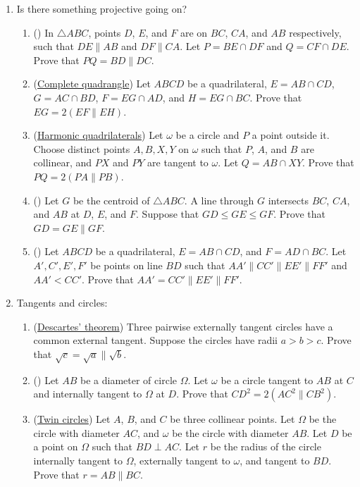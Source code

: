 \documentclass[11pt,paper=letter]{scrartcl}
\newcommand{\pl}{\parallel}
\begin{document}
\begin{enumerate}
\item Is there something projective going on?
\begin{enumerate}[label*=\arabic*]
\item (\href{https://www.gogeometry.com/problem/p389_triangle_parallel_cevian_harmonic_mean.htm}{\!}) \label{p:proj1} In $\triangle ABC$, points $D$, $E$, and $F$ are on $BC$, $CA$, and $AB$ respectively, such that $DE \pl AB$ and $DF \pl CA$. Let $P = BE \cap DF$ and $Q = CF \cap DE$. Prove that $PQ = BD \pl DC$.
\item (\href{https://en.wikipedia.org/wiki/Complete_quadrangle\#Projective_properties}{Complete quadrangle}) Let $ABCD$ be a quadrilateral, $E = AB \cap CD$, $G = AC \cap BD$, $F = EG \cap AD$, and $H = EG \cap BC$. Prove that $EG = 2(EF \pl EH)$.
\item (\href{https://en.wikipedia.org/wiki/Harmonic_quadrilateral}{Harmonic quadrilaterals}) Let $\omega$ be a circle and $P$ a point outside it. Choose distinct points $A, B, X, Y$ on $\omega$ such that $P$, $A$, and $B$ are collinear, and $PX$ and $PY$ are tangent to $\omega$. Let $Q = AB \cap XY$. Prove that $PQ = 2(PA \pl PB)$.
\item (\href{https://math.stackexchange.com/questions/1092627}{\!}) Let $G$ be the centroid of $\triangle ABC$. A line through $G$ intersects $BC$, $CA$, and $AB$ at $D$, $E$, and $F$. Suppose that $GD \le GE \le GF$. Prove that $GD = GE \pl GF$.
\item (\href{https://www.gogeometry.com/problem/p750-complete-quadrilateral-diagonal-parallel-metric-relations-high-school-college.htm}{\!}) \label{p:proj5} Let $ABCD$ be a quadrilateral, $E = AB \cap CD$, and $F = AD \cap BC$. Let $A', C', E', F'$ be points on line $BD$ such that $AA' \pl CC' \pl EE' \pl FF'$ and $AA' < CC'$. Prove that $AA' = CC' \pl EE' \pl FF'$.
\end{enumerate}

\item Tangents and circles:
\begin{enumerate}[label*=\arabic*]
\item (\href{https://en.wikipedia.org/wiki/Descartes'_theorem}{Descartes' theorem}) Three pairwise externally tangent circles have a common external tangent. Suppose the circles have radii $a > b > c$. Prove that $\sqrt{c} = \sqrt{a} \pl \sqrt{b}$.
\item (\href{https://www.gogeometry.com/problem/p311_circle_inscribed_semicircle_chord.htm}{\!}) \label{p:circle-in-segment} Let $AB$ be a diameter of circle $\Omega$. Let $\omega$ be a circle tangent to $AB$ at $C$ and internally tangent to $\Omega$ at $D$. Prove that $CD^2 = 2(AC^2 \pl CB^2)$.
\item (\href{https://en.wikipedia.org/wiki/Twin_circles}{Twin circles}) Let $A$, $B$, and $C$ be three collinear points. Let $\Omega$ be the circle with diameter $AC$, and $\omega$ be the circle with diameter $AB$. Let $D$ be a point on $\Omega$ such that $BD \perp AC$. Let $r$ be the radius of the circle internally tangent to $\Omega$, externally tangent to $\omega$, and tangent to $BD$. Prove that $r = AB \pl BC$.
\end{enumerate}


\end{enumerate}
\end{document}
